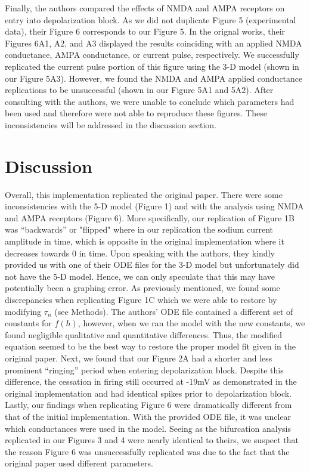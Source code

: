Finally, the authors compared the effects of NMDA and AMPA receptors on entry into depolarization block. As we did not duplicate Figure 5 (experimental data), their Figure 6 corresponds to our Figure 5. In the orignal works, their Figures 6A1, A2, and A3 displayed the results coinciding with an applied NMDA conductance, AMPA conductance, or current pulse, respectively. We successfully replicated the current pulse portion of this figure using the 3-D model (shown in our Figure 5A3). However, we found the NMDA and AMPA applied conductance replications to be unsuccessful (shown in our Figure 5A1 and 5A2). After consulting with the authors, we were unable to conclude which parameters had been used and therefore were not able to reproduce these figures. These inconsistencies will be addressed in the discussion section.  

\section{Discussion}

Overall, this implementation replicated the original paper. There were some inconsistencies with the 5-D model (Figure 1) and with the analysis using NMDA and AMPA receptors (Figure 6). More specifically, our replication of Figure 1B was “backwards” or "flipped" where in our replication the sodium current amplitude in time, which is opposite in the original implementation where it decreases towards 0 in time. Upon speaking with the authors, they kindly provided us with one of their ODE files for the 3-D model but unfortunately did not have the 5-D model. Hence, we can only speculate that this may have potentially been a graphing error. As previously mentioned, we found some discrepancies when replicating Figure 1C which we were able to restore by modifying $\tau_n$  (see Methods). The authors’ ODE file contained a different set of constants for $f(h)$, however, when we ran the model with the new constants, we found negligible qualitative and quantitative differences.  Thus, the modified equation seemed to be the best way to restore the proper model fit given in the original paper. Next, we found that our Figure 2A had a shorter and less prominent “ringing” period when entering depolarization block. Despite this difference, the cessation in firing still occurred at -19mV as demonstrated in the original implementation and had identical spikes prior to depolarization block. Lastly, our findings when replicating Figure 6 were dramatically different from that of the initial implementation. With the provided ODE file, it was unclear which conductances were used in the model. Seeing as the bifurcation analysis replicated in our Figures 3 and 4 were nearly identical to theirs, we suspect that the reason Figure 6 was unsuccessfully replicated was due to the fact that the original paper used different parameters.

